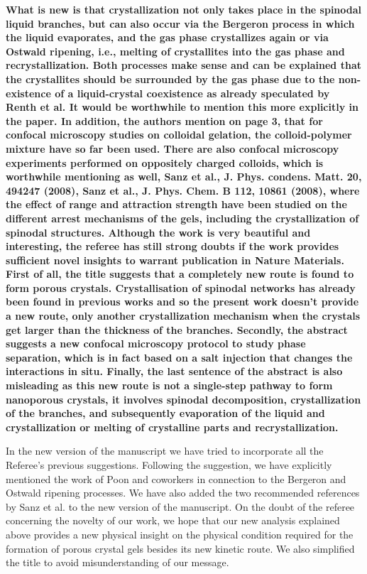 \documentclass[11pt,a4paper]{article}
\newenvironment{referee}%
{\bigskip\singlespacing\bf}%
{\par\bigskip}
\begin{document}
\begin{referee}
What is new is that crystallization not only takes place in the spinodal liquid branches, but can also occur via the Bergeron process in which the liquid evaporates, and the gas phase crystallizes again or via Ostwald ripening, i.e., melting of crystallites into the gas phase and recrystallization. Both processes make sense and can be explained that the crystallites should be surrounded by the gas phase due to the non-existence of a liquid-crystal coexistence as already speculated by Renth et al. It would be worthwhile to mention this more explicitly in the paper. In addition, the authors mention on page 3, that for confocal microscopy studies on colloidal gelation, the colloid-polymer mixture have so far been used. There are also confocal microscopy experiments performed on oppositely charged colloids,
which is worthwhile mentioning as well, Sanz et al., J. Phys. condens. Matt. 20, 494247 (2008), Sanz et al., J. Phys. Chem. B 112, 10861 (2008), where the effect of range and attraction strength have been studied on the different arrest mechanisms of the gels, including the crystallization of spinodal structures. Although the work is very beautiful and interesting, the referee has still strong doubts if the work provides sufficient novel insights to warrant publication in Nature Materials. First of all, the title suggests that a completely new route is found to form porous crystals. Crystallisation of spinodal networks has already been found in previous works and so the present work doesn't provide a new route, only another crystallization mechanism when the crystals get larger than the thickness of the branches. Secondly, the abstract suggests a new confocal microscopy protocol to study phase separation, which is in fact based on a salt injection that changes the interactions in
situ. Finally, the last sentence of the abstract is also misleading as this new route is not a single-step pathway to form nanoporous crystals, it involves spinodal decomposition, crystallization of the branches, and subsequently evaporation of the liquid and crystallization or melting of crystalline parts and recrystallization.
\end{referee}

In the new version of the manuscript we have tried to incorporate all the Referee's previous suggestions. 
Following the suggestion, we have explicitly mentioned the work of Poon and coworkers in connection to the Bergeron and Ostwald ripening processes.  
We have also added the two recommended references by Sanz et al. to the new version of the manuscript. 
On the doubt of the referee concerning the novelty of our work, we hope that our new analysis explained above provides a 
new physical insight on the physical condition required for the formation of porous crystal gels besides its new kinetic route. 
We also simplified the title to avoid misunderstanding of our message. 
\end{document}
